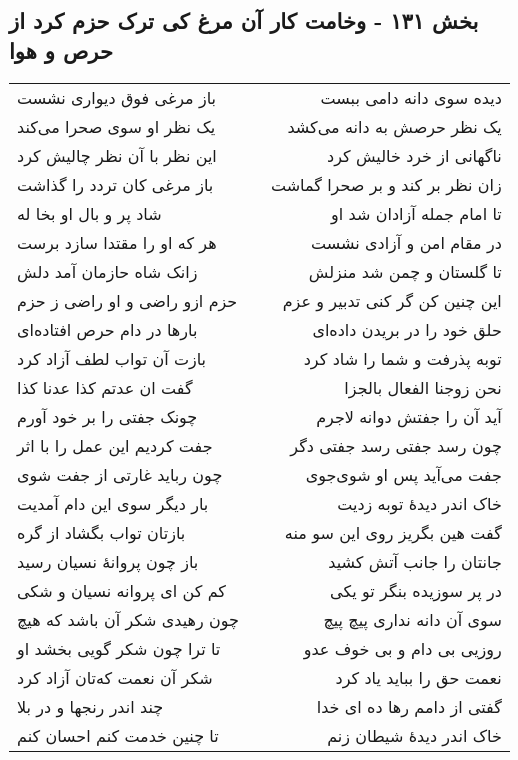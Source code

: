 \begin{center}
\section*{بخش ۱۳۱ - وخامت کار آن مرغ کی ترک حزم کرد از حرص و هوا}
\label{sec:sh131}
\begin{longtable}{l p{0.5cm} r}
باز مرغی فوق دیواری نشست
&&
دیده سوی دانه دامی ببست
\\
یک نظر او سوی صحرا می‌کند
&&
یک نظر حرصش به دانه می‌کشد
\\
این نظر با آن نظر چالیش کرد
&&
ناگهانی از خرد خالیش کرد
\\
باز مرغی کان تردد را گذاشت
&&
زان نظر بر کند و بر صحرا گماشت
\\
شاد پر و بال او بخا له
&&
تا امام جمله آزادان شد او
\\
هر که او را مقتدا سازد برست
&&
در مقام امن و آزادی نشست
\\
زانک شاه حازمان آمد دلش
&&
تا گلستان و چمن شد منزلش
\\
حزم ازو راضی و او راضی ز حزم
&&
این چنین کن گر کنی تدبیر و عزم
\\
بارها در دام حرص افتاده‌ای
&&
حلق خود را در بریدن داده‌ای
\\
بازت آن تواب لطف آزاد کرد
&&
توبه پذرفت و شما را شاد کرد
\\
گفت ان عدتم کذا عدنا کذا
&&
نحن زوجنا الفعال بالجزا
\\
چونک جفتی را بر خود آورم
&&
آید آن را جفتش دوانه لاجرم
\\
جفت کردیم این عمل را با اثر
&&
چون رسد جفتی رسد جفتی دگر
\\
چون رباید غارتی از جفت شوی
&&
جفت می‌آید پس او شوی‌جوی
\\
بار دیگر سوی این دام آمدیت
&&
خاک اندر دیدهٔ توبه زدیت
\\
بازتان تواب بگشاد از گره
&&
گفت هین بگریز روی این سو منه
\\
باز چون پروانهٔ نسیان رسید
&&
جانتان را جانب آتش کشید
\\
کم کن ای پروانه نسیان و شکی
&&
در پر سوزیده بنگر تو یکی
\\
چون رهیدی شکر آن باشد که هیچ
&&
سوی آن دانه نداری پیچ پیچ
\\
تا ترا چون شکر گویی بخشد او
&&
روزیی بی دام و بی خوف عدو
\\
شکر آن نعمت که‌تان آزاد کرد
&&
نعمت حق را بباید یاد کرد
\\
چند اندر رنجها و در بلا
&&
گفتی از دامم رها ده ای خدا
\\
تا چنین خدمت کنم احسان کنم
&&
خاک اندر دیدهٔ شیطان زنم
\\
\end{longtable}
\end{center}
